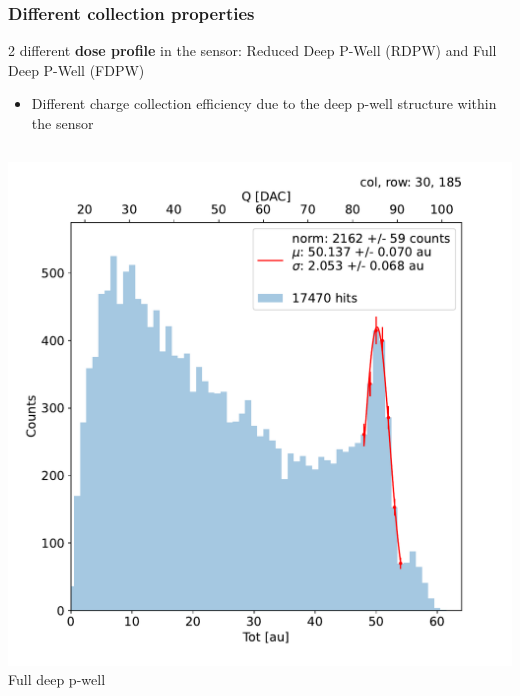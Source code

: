     \begin{frame}
        \frametitle{Different collection properties}
        2 different \textbf{dose profile} in the sensor: Reduced Deep P-Well (RDPW) and Full Deep P-Well (FDPW)

        \begin{itemize}
            \item Different charge collection efficiency due to the deep p-well structure within the sensor
        \end{itemize}
        \begin{columns}
                \includegraphics[width=1.1\linewidth]{figures/charaterization/fit_gauss_r185.pdf}
                \centering Full deep p-well

\end{columns}
\end{frame}
